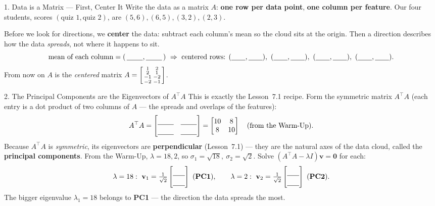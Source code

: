 \documentclass[10pt]{article}
\newcommand{\vv}{\mathbf{v}}
\newcommand{\zero}{\mathbf{0}}
\newcommand{\T}{^{\top}}
\begin{document}
\begin{notesbox}{1. Data is a Matrix --- First, Center It}
Write the data as a matrix $A$: \textbf{one row per data point}, \textbf{one column per feature}. Our four
students, scores $(\text{quiz 1},\text{quiz 2})$, are $(5,6),(6,5),(3,2),(2,3)$.

Before we look for directions, we \textbf{center} the data: subtract each column's mean so the cloud sits at
the origin. Then a direction describes how the data \emph{spreads}, not where it happens to sit.
\[
  \text{mean of each column}=(\,\blank{0.8cm},\blank{0.8cm}\,)\ \Rightarrow\
  \text{centered rows: } (\blank{0.7cm},\blank{0.7cm}),\ (\blank{0.7cm},\blank{0.7cm}),\
  (\blank{0.7cm},\blank{0.7cm}),\ (\blank{0.7cm},\blank{0.7cm}).
\]
From now on $A$ is the \emph{centered} matrix
$A=\begin{bsmallmatrix} 1 & 2\\ 2 & 1\\ -1 & -2\\ -2 & -1 \end{bsmallmatrix}$.
\end{notesbox}

\begin{notesbox}{2. The Principal Components are the Eigenvectors of $A\T A$}
This is exactly the Lesson~7.1 recipe. Form the symmetric matrix $A\T A$ (each entry is a dot product of two
columns of $A$ --- the spreads and overlaps of the features):
\[
  A\T A=\begin{bmatrix}\rule{0pt}{1.1em}\blank{0.8cm} & \blank{0.8cm}\\[2pt]\blank{0.8cm} & \blank{0.8cm}\end{bmatrix}
  =\begin{bmatrix} 10 & 8\\ 8 & 10 \end{bmatrix}\quad(\text{from the Warm-Up}).
\]
Because $A\T A$ is \emph{symmetric}, its eigenvectors are \textbf{perpendicular} (Lesson~7.1) --- they are the
natural axes of the data cloud, called the \textbf{principal components}. From the Warm-Up, $\lambda=18,2$, so
$\sigma_1=\sqrt{18},\ \sigma_2=\sqrt2$. Solve $(A\T A-\lambda I)\vv=\zero$ for each:
\[
  \lambda=18:\ \vv_1=\tfrac1{\sqrt2}\begin{bmatrix}\rule{0pt}{1.1em}\blank{0.6cm}\\[2pt]\blank{0.6cm}\end{bmatrix}
  \ (\textbf{PC1}),\qquad
  \lambda=2:\ \vv_2=\tfrac1{\sqrt2}\begin{bmatrix}\rule{0pt}{1.1em}\blank{0.6cm}\\[2pt]\blank{0.6cm}\end{bmatrix}
  \ (\textbf{PC2}).
\]
The bigger eigenvalue $\lambda_1=18$ belongs to \textbf{PC1} --- the direction the data spreads the most.
\end{notesbox}
\end{document}
